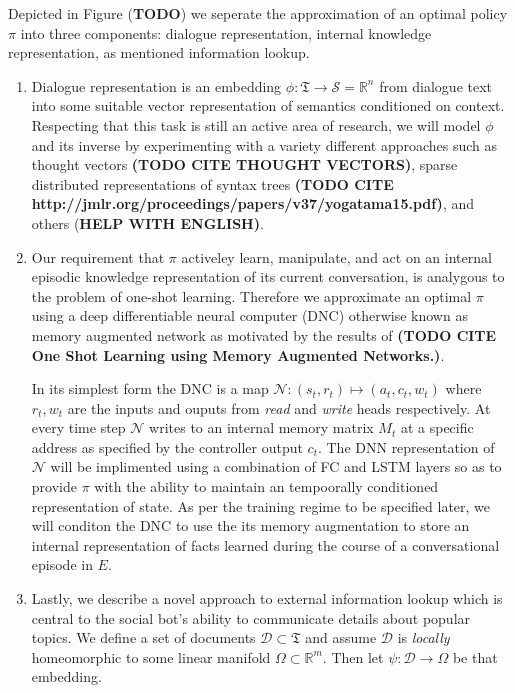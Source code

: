 \documentclass{article} %
\numberwithin{equation}{subsection}
\numberwithin{theorem}{subsection}
\theoremstyle{named}
\def\scriptd{{\mathcal D}}
\def\scriptn{{\mathcal N}}
\def\scripts{{\mathcal S}}
\begin{document}
Depicted in Figure (\textbf{TODO}) we seperate the approximation of an optimal policy $\pi$ into three components: dialogue representation, internal knowledge representation, as mentioned information lookup.
\begin{enumerate}
\item Dialogue representation is an embedding $\phi: \mathfrak{T} \to \scripts = \mathbb{R}^n$ from dialogue text into some suitable vector representation of semantics conditioned on context. Respecting that this task is still an active area of research, we will model $\phi$ and its inverse by experimenting with a variety different approaches such as thought vectors \textbf{(TODO CITE THOUGHT VECTORS)}, sparse distributed representations of syntax trees \textbf{(TODO CITE http://jmlr.org/proceedings/papers/v37/yogatama15.pdf)}, and others (\textbf{HELP WITH ENGLISH)}.  

\item Our requirement that $\pi$ activeley learn, manipulate, and act on an internal episodic knowledge representation of its current conversation, is analygous to the problem of one-shot learning. Therefore we approximate an optimal $\pi$ using a deep differentiable neural computer (DNC) otherwise known as memory augmented network as motivated by the results of \textbf{(TODO CITE One Shot Learning using Memory Augmented Networks.)}. 

In its simplest form the DNC is a map $\scriptn: (s_t, r_t) \mapsto (a_t, c_t, w_t)$ where  $r_t, w_t$ are the inputs and ouputs from \emph{read} and \emph{write} heads respectively. At every time step $\scriptn$ writes to an internal memory matrix $M_t$ at a specific address as specified by the controller output $c_t$. The DNN representation of $\scriptn$ will be implimented using a combination of FC and LSTM layers so as to provide $\pi$ with the ability to maintain an tempoorally conditioned representation of state. As per the training regime to be specified later, we will conditon the DNC to use the its memory augmentation to store an internal representation of facts learned during the course of a conversational episode in $E$.

\item Lastly, we describe a novel approach to external information lookup which is central to the social bot's ability to communicate details about popular topics. We define a set of documents $\scriptd \subset \mathfrak{T}$ and assume $\scriptd$ is \emph{locally} homeomorphic to some linear manifold $\Omega \subset \mathbb{R}^m$. Then let $\psi: \scriptd \to \Omega$ be that embedding. 


\end{enumerate}
\end{document}
